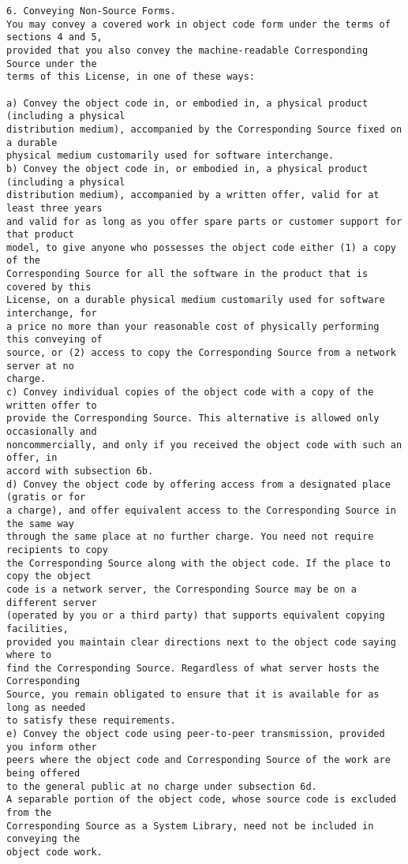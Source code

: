 \begin{verbatim}
6. Conveying Non-Source Forms.
You may convey a covered work in object code form under the terms of sections 4 and 5,
provided that you also convey the machine-readable Corresponding Source under the
terms of this License, in one of these ways:

a) Convey the object code in, or embodied in, a physical product (including a physical
distribution medium), accompanied by the Corresponding Source fixed on a durable
physical medium customarily used for software interchange.
b) Convey the object code in, or embodied in, a physical product (including a physical
distribution medium), accompanied by a written offer, valid for at least three years
and valid for as long as you offer spare parts or customer support for that product
model, to give anyone who possesses the object code either (1) a copy of the
Corresponding Source for all the software in the product that is covered by this
License, on a durable physical medium customarily used for software interchange, for
a price no more than your reasonable cost of physically performing this conveying of
source, or (2) access to copy the Corresponding Source from a network server at no
charge.
c) Convey individual copies of the object code with a copy of the written offer to
provide the Corresponding Source. This alternative is allowed only occasionally and
noncommercially, and only if you received the object code with such an offer, in
accord with subsection 6b.
d) Convey the object code by offering access from a designated place (gratis or for
a charge), and offer equivalent access to the Corresponding Source in the same way
through the same place at no further charge. You need not require recipients to copy
the Corresponding Source along with the object code. If the place to copy the object
code is a network server, the Corresponding Source may be on a different server
(operated by you or a third party) that supports equivalent copying facilities,
provided you maintain clear directions next to the object code saying where to
find the Corresponding Source. Regardless of what server hosts the Corresponding
Source, you remain obligated to ensure that it is available for as long as needed
to satisfy these requirements.
e) Convey the object code using peer-to-peer transmission, provided you inform other
peers where the object code and Corresponding Source of the work are being offered
to the general public at no charge under subsection 6d.
A separable portion of the object code, whose source code is excluded from the
Corresponding Source as a System Library, need not be included in conveying the
object code work.


\end{verbatim}
